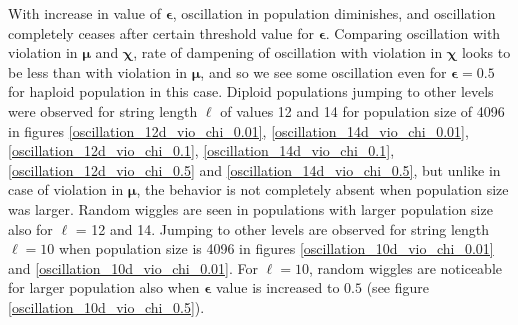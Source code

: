 With increase in value of $\bm{\epsilon}$, 
oscillation in population diminishes, and oscillation completely ceases after certain threshold value for $\bm{\epsilon}$. 
Comparing oscillation with violation in $\bm{\mu}$ and $\bm{\chi}$, rate of dampening of oscillation with violation 
in $\bm{\chi}$ looks to be less than with violation in ${\bm{\mu}}$, 
and so we see some oscillation even for $\bm{\epsilon} = 0.5$ for haploid population in this case. 
Diploid populations jumping to other levels 
were observed for string length $\ell$ of values 12 and 14 for population size of 4096 in 
figures \ref{oscillation_12d_vio_chi_0.01}, \ref{oscillation_14d_vio_chi_0.01}, \ref{oscillation_12d_vio_chi_0.1}, 
\ref{oscillation_14d_vio_chi_0.1}, \ref{oscillation_12d_vio_chi_0.5} and \ref{oscillation_14d_vio_chi_0.5}, 
but unlike in case of violation in $\bm{\mu}$, the behavior is not completely absent when population size was larger. 
Random wiggles are seen in populations with larger population size also for $\ell$ = 12 and 14. 
Jumping to other levels are observed for string length $\ell = 10$ when population size is 4096 in figures \ref{oscillation_10d_vio_chi_0.01} 
and \ref{oscillation_10d_vio_chi_0.01}.
For $\ell = 10$, random wiggles are 
noticeable for larger population also when $\bm{\epsilon}$ value is increased to $0.5$ (see figure \ref{oscillation_10d_vio_chi_0.5}).


